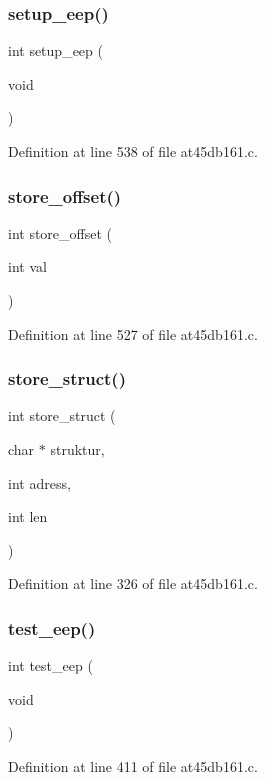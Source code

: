 \subsubsection{setup\+\_\+eep()}
{\footnotesize\ttfamily int setup\+\_\+eep (\begin{DoxyParamCaption}\item[{void}]{ }\end{DoxyParamCaption})}



Definition at line 538 of file at45db161.\+c.

\mbox{\label{at45db161_8h_a0d1acbab3520ceb76b879ed1b0186230}} 
\subsubsection{store\+\_\+offset()}
{\footnotesize\ttfamily int store\+\_\+offset (\begin{DoxyParamCaption}\item[{int}]{val }\end{DoxyParamCaption})}



Definition at line 527 of file at45db161.\+c.

\mbox{\label{at45db161_8h_a5d0a823ec7969bcb21f892a927718fcc}} 
\subsubsection{store\+\_\+struct()}
{\footnotesize\ttfamily int store\+\_\+struct (\begin{DoxyParamCaption}\item[{char $\ast$}]{struktur,  }\item[{int}]{adress,  }\item[{int}]{len }\end{DoxyParamCaption})}



Definition at line 326 of file at45db161.\+c.

\mbox{\label{at45db161_8h_a98cbe81d410e10f092759a1c7ee962e5}} 
\subsubsection{test\+\_\+eep()}
{\footnotesize\ttfamily int test\+\_\+eep (\begin{DoxyParamCaption}\item[{void}]{ }\end{DoxyParamCaption})}



Definition at line 411 of file at45db161.\+c.

